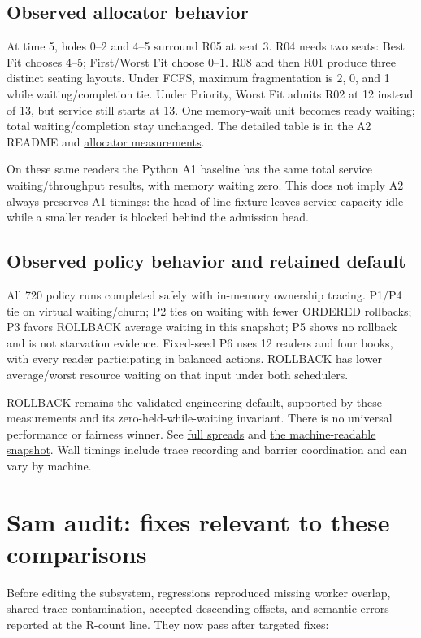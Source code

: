 \documentclass[11pt,a4paper]{article}
\begin{document}
\subsection{Observed allocator behavior}
At time 5, holes 0--2 and 4--5 surround R05 at seat 3. R04 needs two seats:
Best Fit chooses 4--5; First/Worst Fit choose 0--1. R08 and then R01 produce
three distinct seating layouts. Under FCFS, maximum fragmentation is 2, 0,
and 1 while waiting/completion tie. Under Priority, Worst Fit admits R02 at
12 instead of 13, but service still starts at 13. One memory-wait unit becomes
ready waiting; total waiting/completion stay unchanged. The detailed table is
in the A2 README and \href{allocator_comparison.md}{allocator measurements}.

On these same readers the Python A1 baseline has the same total service
waiting/throughput results, with memory waiting zero. This does not imply A2
always preserves A1 timings: the head-of-line fixture leaves service capacity
idle while a smaller reader is blocked behind the admission head.

\subsection{Observed policy behavior and retained default}
All 720 policy runs completed safely with in-memory ownership tracing. P1/P4
tie on virtual waiting/churn; P2 ties on waiting with fewer ORDERED rollbacks;
P3 favors ROLLBACK average waiting in this snapshot; P5 shows no rollback and
is not starvation evidence. Fixed-seed P6 uses 12 readers and four books,
with every reader participating in balanced actions. ROLLBACK has lower
average/worst resource waiting on that input under both schedulers.

ROLLBACK remains the validated engineering default, supported by these
measurements and its zero-held-while-waiting invariant. There is no universal
performance or fairness winner. See \href{policy_comparison.md}{full spreads}
and \href{policy_results.json}{the machine-readable snapshot}. Wall timings
include trace recording and barrier coordination and can vary by machine.

\section{Sam audit: fixes relevant to these comparisons}
Before editing the subsystem, regressions reproduced missing worker overlap,
shared-trace contamination, accepted descending offsets, and semantic errors
reported at the R-count line. They now pass after targeted fixes:
\end{document}
